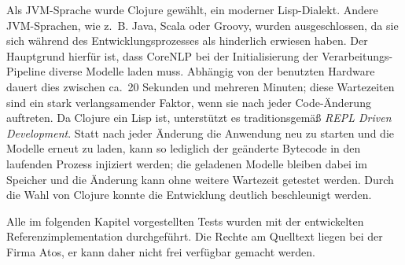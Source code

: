 Als JVM-Sprache wurde Clojure gewählt, ein moderner Lisp-Dialekt.
Andere JVM-Sprachen, wie z.~B. Java, Scala oder Groovy, wurden ausgeschlossen, da sie sich während des Entwicklungsprozesses als hinderlich erwiesen haben.
Der Hauptgrund hierfür ist, dass CoreNLP bei der Initialisierung der Verarbeitungs-Pipeline diverse Modelle laden muss.
Abhängig von der benutzten Hardware dauert dies zwischen ca.\ 20 Sekunden und mehreren Minuten;
diese Wartezeiten sind ein stark verlangsamender Faktor, wenn sie nach jeder Code-Änderung auftreten.
Da Clojure ein Lisp ist, unterstützt es traditionsgemäß \textit{REPL Driven Development}.
Statt nach jeder Änderung die Anwendung neu zu starten und die Modelle erneut zu laden, kann so lediglich der geänderte Bytecode in den laufenden Prozess injiziert werden;
die geladenen Modelle bleiben dabei im Speicher und die Änderung kann ohne weitere Wartezeit getestet werden.
Durch die Wahl von Clojure konnte die Entwicklung deutlich beschleunigt werden.

Alle im folgenden Kapitel vorgestellten Tests wurden mit der entwickelten Referenzimplementation durchgeführt.
Die Rechte am Quelltext liegen bei der Firma Atos, er kann daher nicht frei verfügbar gemacht werden.
